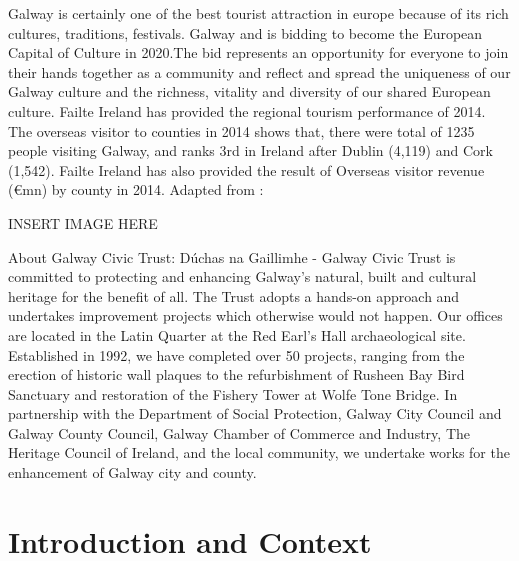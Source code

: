 \cite{galway20} Galway is certainly one of the best tourist attraction in europe because of its rich cultures, traditions, festivals. Galway  and is bidding to become the European Capital of Culture in 2020.The bid represents an opportunity for everyone to join their hands together as a community and reflect and spread the uniqueness of our Galway culture and the richness, vitality and diversity of our shared European culture. \cite{failteireland}Failte Ireland has provided the regional tourism performance of 2014.  The overseas visitor to counties in 2014 shows that, there were total of 1235 people visiting Galway, and ranks 3rd in Ireland after Dublin (4,119) and Cork (1,542). Failte Ireland  has also provided the result of Overseas visitor revenue  (€mn) by county in 2014.  Adapted from : 

	INSERT IMAGE HERE


About Galway Civic Trust:  \cite{galway20}Dúchas na Gaillimhe - Galway Civic Trust is committed to protecting and enhancing Galway's natural, built and cultural heritage for the benefit of all. The Trust adopts a hands-on approach and undertakes improvement projects which otherwise would not happen. Our offices are located in the Latin Quarter at the Red Earl's Hall archaeological site.
Established in 1992, we have completed over 50 projects, ranging from the erection of historic wall plaques to the refurbishment of Rusheen Bay Bird Sanctuary and restoration of the Fishery Tower at Wolfe Tone Bridge.
In partnership with the Department of Social Protection, Galway City Council and Galway County Council, Galway Chamber of Commerce and Industry, The Heritage Council of Ireland, and the local community, we undertake works for the enhancement of Galway city and county.

\chapter{Introduction and Context}
